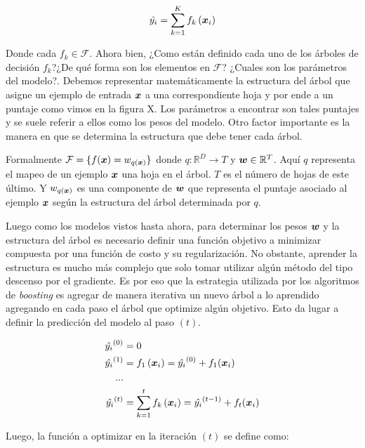 \begin{equation} \label{eq:xgb-model-1}
    \hat{y_{i}} = \sum_{k=1}^{K} f_{k} \left( \boldsymbol{x}_{i}\right)
\end{equation}

Donde cada $f_k \in \mathcal{F}$. Ahora bien, ¿Como están definido cada uno de
los árboles de decisión $f_k$?¿De qué forma son los elementos en $\mathcal{F}$?
¿Cuales son los parámetros del modelo?. Debemos representar matemáticamente la
estructura del árbol que asigne un ejemplo de entrada $\boldsymbol{x}$ a una
correspondiente hoja y por ende a un puntaje como vimos en la figura X. Los
parámetros a encontrar son tales puntajes y se suele referir a ellos como los
pesos del modelo. Otro factor importante es la manera en que se determina la
estructura que debe tener cada árbol.

Formalmente $\mathcal{F} = \{f(\boldsymbol{x}) = w_{q\left( \boldsymbol{x} \right)}\}$ donde
$q : \mathbb{R}^{D} \rightarrow T$ y $\boldsymbol{w} \in \mathbb{R}^{T}$. Aquí $q$
representa el mapeo de un ejemplo $\boldsymbol{x}$ una hoja en el árbol. $T$ es el
número de hojas de este último. Y $w_{q\left( \boldsymbol{x} \right)}$ es una
componente de $\boldsymbol{w}$ que representa el puntaje asociado al ejemplo
$\boldsymbol{x}$ según la estructura del árbol determinada por $q$.

Luego como los modelos vistos hasta ahora, para determinar los pesos $\boldsymbol{w}$
y la estructura del árbol es necesario definir una función objetivo a minimizar
compuesta por una función de costo y su regularización. No obstante, aprender la
estructura es mucho más complejo que solo tomar utilizar algún método del tipo
descenso por el gradiente. Es por eso que la estrategia utilizada por los
algoritmos de \emph{boosting} es agregar de manera iterativa un nuevo árbol a lo
aprendido agregando en cada paso el árbol que optimize algún objetivo. Esto da
lugar a definir la predicción del modelo al paso $(t)$.

\begin{align*}
    \hat{y_i}^{(0)} &= 0 \\
    \hat{y_i}^{(1)} &= f_{1}\left( \boldsymbol{x}_i \right) = \hat{y_i}^{(0)} + f_1{(\boldsymbol{x}_i)} \\
    ... \\
    \hat{y_i}^{(t)} &= \sum_{k=1}^{t} f_{k} \left( \boldsymbol{x}_{i}\right) = \hat{y_i}^{(t - 1)} + f_t{(\boldsymbol{x}_i)}
\end{align*}

Luego, la función a optimizar en la iteración $(t)$ se define como:

